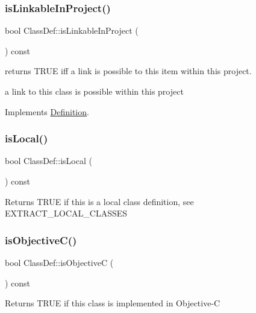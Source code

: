 \subsubsection{\texorpdfstring{isLinkableInProject()}{isLinkableInProject()}}
{\footnotesize\ttfamily bool Class\+Def\+::is\+Linkable\+In\+Project (\begin{DoxyParamCaption}{ }\end{DoxyParamCaption}) const\hspace{0.3cm}{\ttfamily [virtual]}}

returns T\+R\+UE iff a link is possible to this item within this project.

a link to this class is possible within this project 

Implements \mbox{\hyperlink{class_definition_a845891c7206d40c3664b562636cdf9fc}{Definition}}.

\mbox{\label{class_class_def_a9fb4287aacaa5dd5723c03d93d7c9d93}} 
\subsubsection{\texorpdfstring{isLocal()}{isLocal()}}
{\footnotesize\ttfamily bool Class\+Def\+::is\+Local (\begin{DoxyParamCaption}{ }\end{DoxyParamCaption}) const}

Returns T\+R\+UE if this is a local class definition, see E\+X\+T\+R\+A\+C\+T\+\_\+\+L\+O\+C\+A\+L\+\_\+\+C\+L\+A\+S\+S\+ES \mbox{\label{class_class_def_a9e0c450e5e90f80705e5011aeda172f5}} 
\subsubsection{\texorpdfstring{isObjectiveC()}{isObjectiveC()}}
{\footnotesize\ttfamily bool Class\+Def\+::is\+ObjectiveC (\begin{DoxyParamCaption}{ }\end{DoxyParamCaption}) const}

Returns T\+R\+UE if this class is implemented in Objective-\/C \mbox{\label{class_class_def_a83232faa3ba4a974b2faf689662370e1}} 
